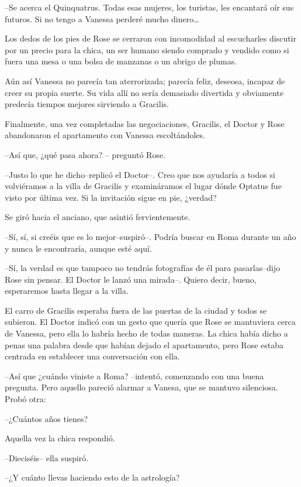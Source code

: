 --Se acerca el Quinquatrus. Todas esas mujeres, los turistas, les
encantará oír sus futuros. Si no tengo a Vanessa perderé mucho
dinero\ldots{}

Los dedos de los pies de Rose se cerraron con incomodidad al escucharles
discutir por un precio para la chica, un ser humano siendo comprado y
vendido como si fuera una mesa o una bolsa de manzanas o un abrigo de
plumas.

Aún así Vanessa no parecía tan aterrorizada; parecía feliz, deseosa,
incapaz de creer su propia suerte. Su vida allí no sería demasiado
divertida y obviamente predecía tiempos mejores sirviendo a Gracilis.

Finalmente, una vez completadas las negociaciones, Gracilis, el Doctor y
Rose abandonaron el apartamento con Vanessa escoltándoles.

--Así que, ¿qué pasa ahora? -- preguntó Rose.

--Justo lo que he dicho--replicó el Doctor--. Creo que nos ayudaría a
todos si volviéramos a la villa de Gracilis y examináramos el lugar
dónde Optatus fue visto por última vez. Si la invitación sigue en pie,
¿verdad?

Se giró hacia el anciano, que asintió fervientemente.

--Sí, sí, si creéis que es lo mejor--suspiró--. Podría buscar en Roma
durante un año y nunca le encontraría, aunque esté aquí.

--Sí, la verdad es que tampoco no tendrás fotografías de él para
pasarlas--dijo Rose sin pensar. El Doctor le lanzó una mirada--. Quiero
decir, bueno, esperaremos hasta llegar a la villa.

El carro de Gracilis esperaba fuera de las puertas de la ciudad y todos
se subieron. El Doctor indicó con un gesto que quería que Rose se
mantuviera cerca de Vanessa, pero ella lo habría hecho de todas maneras.
La chica había dicho a penas una palabra desde que habían dejado el
apartamento, pero Rose estaba centrada en establecer una conversación
con ella.

--Así que ¿cuándo viniste a Roma? --intentó, comenzando con una buena
pregunta. Pero aquello pareció alarmar a Vanesa, que se mantuvo
silenciosa. Probó otra:

--¿Cuántos años tienes?

Aquella vez la chica respondió.

--Dieciséis-- ella suspiró.

--¿Y cuánto llevas haciendo esto de la astrología?

